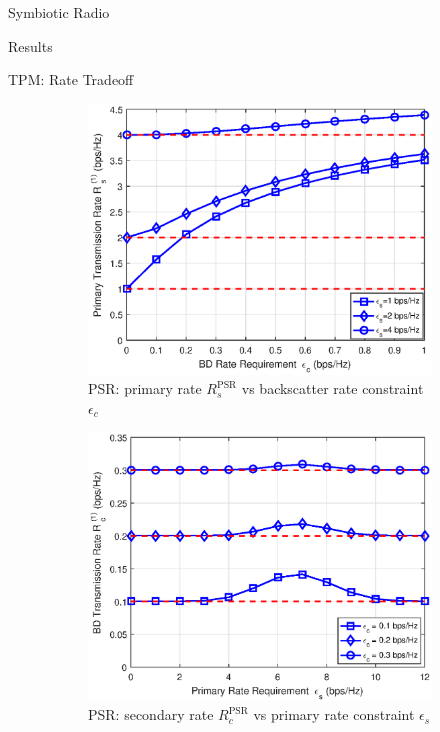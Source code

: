 \documentclass[9pt]{beamer}
\begin{document}
\begin{section}{Symbiotic Radio}
\begin{subsection}{Results}
			\begin{frame}{TPM: Rate Tradeoff}
				\begin{figure}
					\centering
					\begin{subfigure}{.48\textwidth}
						\centering
						\includegraphics[width=0.8\linewidth]{assets/psr_rs_rc.eps}
						\caption{PSR: primary rate $R_{s}^{\text{PSR}}$ vs backscatter rate constraint $\epsilon_c$}
					\end{subfigure}
					\begin{subfigure}{.48\textwidth}
						\centering
						\includegraphics[width=0.8\linewidth]{assets/psr_rc_rs.eps}
						\caption{PSR: secondary rate $R_{c}^{\text{PSR}}$ vs primary rate constraint $\epsilon_s$}
					\end{subfigure}
					\begin{subfigure}{.48\textwidth}
						\centering

\end{subfigure}
\end{figure}
\end{frame}
\end{subsection}
\end{section}
\end{document}
